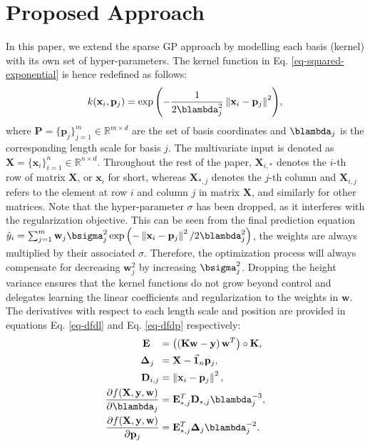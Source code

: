 \documentclass[useAMS,usenatbib,fleqn]{mn2e}
\begin{document}
\section{Proposed Approach}
\label{sec-proposed-approach}

In this paper, we extend the sparse GP approach by modelling each basis (kernel) with its own set of hyper-parameters. The kernel function in Eq. \eqref{eq-squared-exponential} is hence redefined as follows:
\begin{equation}
\label{eq-squared-exponential-extension}
k(\mathbf{x}_{i},\mathbf{p}_{j}) = \exp{\left(-\frac{1}{2\blambda_{j}^{2}}\left\| \mathbf{x}_{i}-\mathbf{p}_{j}\right\|^{2}\right)},
\end{equation}
where $\mathbf{P}=\{\mathbf{p}_{j}\}_{j=1}^{m} \in \mathbb{R}^{m\times d}$ are the set of basis coordinates and $\blambda_{j}$ is the corresponding length scale for basis $j$. The multivariate input is denoted as $\mathbf{X}=\{\mathbf{x}_{i}\}_{i=1}^{n} \in \mathbb{R}^{n\times d}$. Throughout the rest of the paper, $\mathbf{X}_{i,*}$ denotes the $i$-th row of matrix $\mathbf{X}$, or $\mathbf{x}_{i}$ for short, whereas $\mathbf{X}_{*,j}$ denotes the $j$-th column and $\mathbf{X}_{i,j}$ refers to the element at row $i$ and column $j$ in matrix $\mathbf{X}$, and similarly for other matrices. Note that the hyper-parameter $\sigma$ has been dropped, as it interferes with the regularization objective. This can be seen from the final prediction equation $\hat y_{i}=\sum_{j=1}^{m}\mathbf{w}_{j}\bsigma_{j}^{2}\exp{\left(-\left\| \mathbf{x}_{i}-\mathbf{p}_{j}\right\|^{2}/2\blambda_{j}^{2}\right)}$, the weights are always multiplied by their associated $\sigma$. Therefore, the optimization process will always compensate for decreasing $\mathbf{w}_{j}^{2}$ by increasing $\bsigma_{j}^{2}$. Dropping the height variance ensures that the kernel functions do not grow beyond control and delegates learning the linear coefficients and regularization to the weights in $\mathbf{w}$. The derivatives with respect to each length scale and position are provided in equations Eq. \eqref{eq-dfdl} and Eq. \eqref{eq-dfdp} respectively:
\begin{subequations}
\begin{align}
\mathbf{E}\phantom{_{i,j}} &= \left(\left(\mathbf{K}\mathbf{w}-\mathbf{y}\right)\mathbf{w}^{T}\right)\circ\mathbf{K},\\
\mathbf\Delta_{j\phantom{,i}} &= \mathbf{X}-\vec{\mathbf{1}}_{n}\mathbf{p}_{j},\\
\mathbf{D}_{i,j} &= \left \| \mathbf{x}_{i}-\mathbf{p}_{j}\right\|^{2},\\
\label{eq-dfdl}
\frac{\partial f(\mathbf{X},\mathbf{y},\mathbf{w})}{\partial \blambda_{j}} &=\mathbf{E}_{*,j}^{T}\mathbf{D}_{*,j}\blambda_{j}^{-3},\\
\label{eq-dfdp}
\frac{\partial f(\mathbf{X},\mathbf{y},\mathbf{w})}{\partial \mathbf{p}_{j}} &=\mathbf{E}_{*,j}^{T}\mathbf\Delta_{j}\blambda_{j}^{-2}.
\end{align}
\end{subequations}
\end{document}
